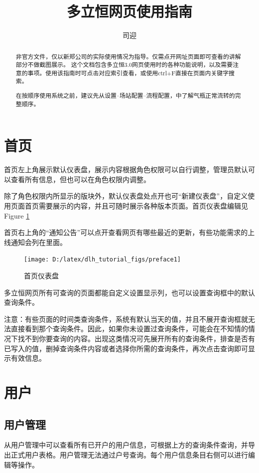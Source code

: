 \documentclass[UTF8]{ctexart}
\title{多立恒网页使用指南}
\author{司迎}
\begin{document}
\maketitle
\tableofcontents
\begin{abstract}
非官方文件，仅以新郑公司的实际使用情况为指导。仅需点开网址页面即可查看的讲解部分不做截图展示。
这个文档包含多立恒3.0网页使用时的各种功能说明，以及需要注意的事项。使用该指南时可点击对应索引查看，或使用ctrl+F直接在页面内关键字搜索。

在按顺序使用系统之前，建议先从设置--场站配置--流程配置，中了解气瓶正常流转的完整顺序。
\end{abstract}

\section{首页}

首页左上角展示默认仪表盘，展示内容根据角色权限可以自行调整，管理员默认可以查看所有信息，但也可以在角色权限内调整。

除了角色权限内所显示的版块外，默认仪表盘处点开也可“新建仪表盘”，自定义使用页面首页需要展示的内容，并且可随时展示各种版本页面。首页仪表盘编辑见Figure \ref{fig:preface1}

首页右上角的“通知公告”可以点开查看网页有哪些最近的更新，有些功能需求的上线通知会列在里面。
\begin{figure}[h]
	\centering
	\texttt{[image: D:/latex/dlh\_tutorial\_figs/preface1]}
	\caption{首页仪表盘}
	\label{fig:preface1}
\end{figure}

多立恒网页所有可查询的页面都能自定义设置显示列，也可以设置查询框中的默认查询条件。

注意：有些页面的时间类查询条件，系统有默认当天的值，并且不展开查询框就无法直接看到那个查询条件。因此，如果你未设置过查询条件，可能会在不知情的情况下找不到你要查询的内容。出现这类情况可先展开所有的查询条件，排查是否有已写入的值，删掉查询条件内容或者选择你所需的查询条件，再次点击查询即可显示有效信息。

\section{用户}

\subsection{用户管理}
从用户管理中可以查看所有已开户的用户信息，可根据上方的查询条件查询，并导出正式用户表格。用户管理无法通过户号查询。每个用户信息条目右侧可以进行编辑等操作。
\end{document}
